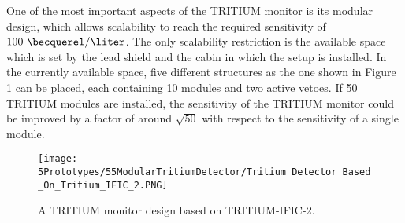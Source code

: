 One of the most important aspects of the TRITIUM monitor is its modular design, which allows scalability to reach the required sensitivity of $100~\becquerel/\liter$. The only scalability restriction is the available space which is set by the lead shield and the cabin in which the setup is installed. In the currently available space, five different structures as the one shown in Figure \ref{fig:TritiumMonitorIFIC2Design} can be placed, each containing 10 modules and two active vetoes. If 50 TRITIUM modules are installed, the sensitivity of the TRITIUM monitor could be improved by a factor of around $\sqrt{50}$ with respect to the sensitivity of a single module.

\begin{figure}[h]
\centering
\texttt{[image: 5Prototypes/55ModularTritiumDetector/Tritium\_Detector\_Based\_On\_Tritium\_IFIC\_2.PNG]}
\caption{A TRITIUM monitor design based on TRITIUM-IFIC-2.\label{fig:TritiumMonitorIFIC2Design}}
\end{figure}